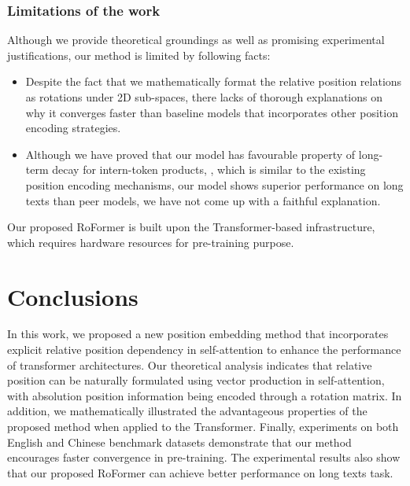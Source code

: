 \documentclass{article}
\begin{document}
\subsubsection{Limitations of the work} 
Although we provide theoretical groundings as well as promising experimental justifications, our method is limited by following facts: 
\begin{itemize}
	\item Despite the fact that we mathematically format the relative position relations as rotations under 2D sub-spaces, there lacks of thorough explanations on why it converges faster than baseline models that incorporates other position encoding strategies.
	\item Although we have proved that our model has favourable property of long-term decay for intern-token products, , which is similar to the existing position encoding mechanisms, our model shows superior performance on long texts than peer models, we have not come up with a faithful explanation.
\end{itemize}
Our proposed RoFormer is built upon the  Transformer-based infrastructure, which requires  hardware resources for pre-training purpose.


\section{Conclusions} \label{sec:conclu}

In this work, we proposed a new position embedding method that incorporates explicit relative position dependency in self-attention to enhance the performance of transformer architectures. Our theoretical analysis indicates that relative position can be naturally formulated using vector production in self-attention, with absolution position information being encoded through a rotation matrix. In addition, we mathematically illustrated the advantageous properties of the proposed method when applied to the Transformer. Finally, experiments on both English and Chinese benchmark datasets demonstrate that our method encourages faster convergence in pre-training. The experimental results also show that our proposed RoFormer can achieve better performance on long texts task. 



\end{document}
